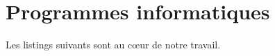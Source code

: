 \chapter{Programmes informatiques}
\label{chap-listings}

Les listings suivants sont au cœur de notre travail.





